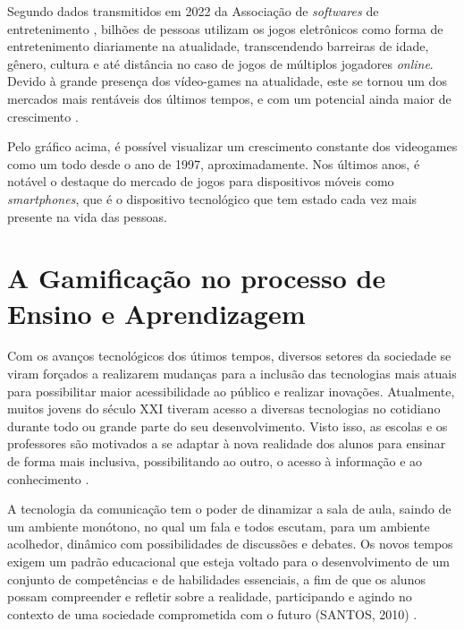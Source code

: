 Segundo dados transmitidos em 2022 da Associação de \textit{softwares} de entretenimento \cite{esa_report_2022}, bilhões de pessoas utilizam os jogos eletrônicos como forma de entretenimento diariamente na atualidade, transcendendo barreiras de idade, gênero, cultura e até distância no caso de jogos de múltiplos jogadores \textit{online}. Devido à grande presença dos vídeo-games na atualidade, este se tornou um dos mercados mais rentáveis dos últimos tempos, e com um potencial ainda maior de crescimento \cite{video-game-economics}.


Pelo gráfico acima, é possível visualizar um crescimento constante dos videogames como um todo desde o ano de 1997, aproximadamente. Nos últimos anos, é notável o destaque do mercado de jogos para dispositivos móveis como \textit{smartphones}, que é o dispositivo tecnológico que tem estado cada vez mais presente na vida das pessoas.

\section{A Gamificação no processo de Ensino e Aprendizagem}

Com os avanços tecnológicos dos útimos tempos, diversos setores da sociedade se viram forçados a realizarem mudanças para a inclusão das tecnologias mais atuais para possibilitar maior acessibilidade ao público e realizar inovações. Atualmente, muitos jovens do século XXI tiveram acesso a diversas tecnologias no cotidiano durante todo ou grande parte do seu desenvolvimento. Visto isso, as escolas e os professores são motivados a se adaptar à nova realidade dos alunos para  ensinar de forma mais inclusiva, possibilitando ao outro, o acesso à informação e ao conhecimento \cite{tecnologia-professores}.

A tecnologia da comunicação tem o poder de dinamizar a sala de aula, saindo de um ambiente monótono, no qual um fala e todos escutam, para um ambiente acolhedor, dinâmico com possibilidades de discussões e debates. Os novos tempos exigem um padrão educacional que esteja voltado para o desenvolvimento de um conjunto de competências e de habilidades essenciais, a fim de que os alunos possam compreender e refletir sobre a realidade, participando e agindo no contexto de uma sociedade comprometida com o futuro (SANTOS, 2010) \cite{tecnologia-professores}.


